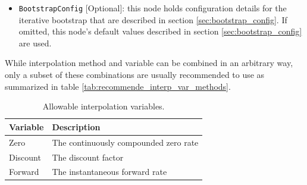 \begin{itemize}
All standard interpolation methods are supported (e.g., Linear, LogLinear, NaturalCubic, etc.,).

If the element is omitted or left blank, then it defaults to \emph{False}, which preserves the traditional behavior
of including a t0 point (with $DF = 1.0$ for discount curves, or extrapolated rate for zero/forward curves) in the
interpolation input.

\item \lstinline!BootstrapConfig! [Optional]: this node holds configuration details for the iterative bootstrap
that are described in section \ref{sec:bootstrap_config}. If omitted, this node's default values described
in section \ref{sec:bootstrap_config} are used.
\end{itemize}

While interpolation method and variable can be combined in an arbitrary way, only a subset of these combinations are
usually recommended to use as summarized in table \ref{tab:recommende_interp_var_methods}.

\begin{table}[H]
\centering
  \begin{tabular}{|l|l|}
    \hline
    {\bfseries Variable} & {\bfseries Description} \\
    \hline
    Zero & The continuously compounded zero rate \\ \hline
    Discount & The discount factor \\ \hline
    Forward & The instantaneous forward rate \\ \hline
  \end{tabular}
  \caption{Allowable interpolation variables.}
  \label{tab:allow_interp_variables}
\end{table}

